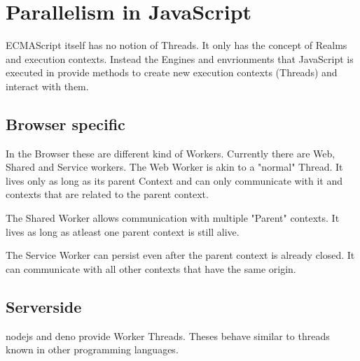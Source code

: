 \section{Parallelism in JavaScript}
ECMAScript itself has no notion of Threads. It only has the concept of Realms and execution contexts.
Instead the Engines and envrionments that JavaScript is executed in provide methods to create new execution contexts (Threads) and interact with them.


\subsection{Browser specific}
In the Browser these are different kind of Workers.
Currently there are Web, Shared and Service workers.
The Web Worker is akin to a "normal" Thread. It lives only as long as its parent Context and can only communicate with it and contexts that are related to the parent context.

The Shared Worker allows communication with multiple "Parent" contexts. It lives as long as atleast one parent context is still alive.


The Service Worker can persist even after the parent context is already closed. It can communicate with all other contexts that have the same origin.


\subsection{Serverside}
nodejs and deno provide Worker Threads. Theses behave similar to threads known in other programming languages.

